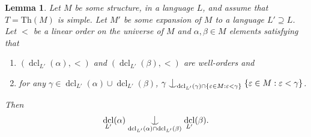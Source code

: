 \documentclass[a4paper]{amsart}
\theoremstyle{plain}
\newtheorem{lemma}[theorem]{Lemma}
\theoremstyle{definition}
\theoremstyle{remark}
\numberwithin{equation}{section}
\newcommand{\forkindep}[1][]{%
  \mathrel{
    \mathop{
      \vcenter{
        \hbox{\oalign{\noalign{\kern-.3ex}\hfil$\vert$\hfil\cr
              \noalign{\kern-.7ex}
              $\smile$\cr\noalign{\kern-.3ex}}}
      }
    }\displaylimits_{#1}
  }
}
\DeclareMathOperator{\dcl}{dcl}
\begin{document}
\begin{lemma}\label{L:technical simple lemma}
Let $M$ be some structure, in a language $L$, and assume that $T=\mathrm{Th}(M)$ is simple. Let $M'$ be some expansion of $M$ to a language $L'\supseteq L$. Let $<$ be a linear order on the universe of $M$ and $\alpha,\beta\in M$ elements satisfying that
\begin{enumerate}
\item $(\dcl_{L'}(\alpha),<)$ and $(\dcl_{L'}(\beta),<)$ are well-orders and
\item  for any $\gamma\in \dcl_{L'}(\alpha)\cup \dcl_{L'}(\beta)$, $\gamma \forkindep[\dcl_{L'}(\gamma)\cap \{\varepsilon\in M:\varepsilon<\gamma\}]\{\varepsilon\in M:\varepsilon<\gamma\}$.
\end{enumerate}


Then  \[\dcl_{L'}(\alpha)\forkindep[\dcl_{L'}(\alpha)\cap \dcl_{L'}(\beta)]\dcl_{L'}(\beta).\]
\end{lemma}
\end{document}
